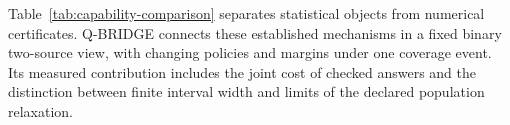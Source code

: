 Table~\ref{tab:capability-comparison} separates statistical objects from numerical certificates. Q-BRIDGE connects these established mechanisms in a fixed binary two-source view, with changing policies and margins under one coverage event. Its measured contribution includes the joint cost of checked answers and the distinction between finite interval width and limits of the declared population relaxation.
